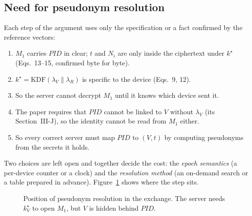 \subsection*{Need for pseudonym resolution}
Each step of the argument uses only the specification or a fact confirmed by the reference vectors:
\begin{enumerate}
\item $M_1$ carries $PID$ in clear; $t$ and $N_i$ are only inside the ciphertext under $k^\star$ (Eqs.~13--15, confirmed byte for byte).
\item $k^\star=\mathrm{KDF}(\lambda_V\|\lambda_R)$ is specific to the device (Eqs.~9, 12).
\item So the server cannot decrypt $M_1$ until it knows which device sent it.
\item The paper requires that $PID$ cannot be linked to $V$ without $\lambda_V$ (its Section~III-J), so the identity cannot be read from $M_1$ either.
\item So every correct server must map $PID$ to $(V,t)$ by computing pseudonyms from the secrets it holds.
\end{enumerate}
Two choices are left open and together decide the cost: the \emph{epoch semantics} (a per-device counter or a clock) and the \emph{resolution method} (an on-demand search or a table prepared in advance). Figure~\ref{fig:flow} shows where the step sits.

\begin{figure}[H]
\centering
{}
\caption{Position of pseudonym resolution in the exchange. The server needs $k^\star_V$ to open $M_1$, but $V$ is hidden behind $PID$.}
\label{fig:flow}
\end{figure}

